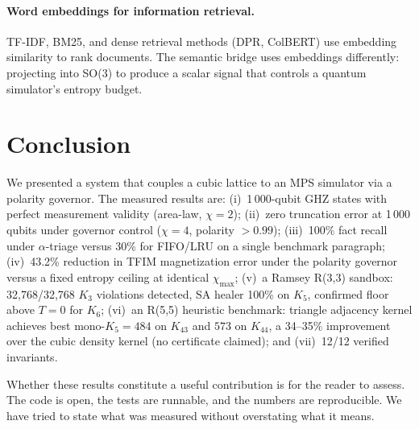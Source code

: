 \documentclass{article}
\begin{document}
\paragraph{Word embeddings for information retrieval.}
TF-IDF, BM25, and dense retrieval methods (DPR, ColBERT) use embedding similarity to rank documents.  The semantic bridge uses embeddings differently: projecting into SO(3) to produce a scalar signal that controls a quantum simulator's entropy budget.

\section{Conclusion}

We presented a system that couples a cubic lattice to an MPS simulator via a polarity governor.  The measured results are: (i)~1\,000-qubit GHZ states with perfect measurement validity (area-law, $\chi=2$); (ii)~zero truncation error at 1\,000 qubits under governor control ($\chi=4$, polarity $>0.99$); (iii)~100\% fact recall under $\alpha$-triage versus 30\% for FIFO/LRU on a single benchmark paragraph; (iv)~43.2\% reduction in TFIM magnetization error under the polarity governor versus a fixed entropy ceiling at identical $\chi_{\max}$; (v)~a Ramsey R(3,3) sandbox: 32,768/32,768 $K_3$ violations detected, SA healer 100\% on $K_5$, confirmed floor above $T=0$ for $K_6$; (vi)~an R(5,5) heuristic benchmark: triangle adjacency kernel achieves best mono-$K_5=484$ on $K_{43}$ and $573$ on $K_{44}$, a 34--35\% improvement over the cubic density kernel (no certificate claimed); and (vii)~12/12 verified invariants.

Whether these results constitute a useful contribution is for the reader to assess.  The code is open, the tests are runnable, and the numbers are reproducible.  We have tried to state what was measured without overstating what it means.
\end{document}
